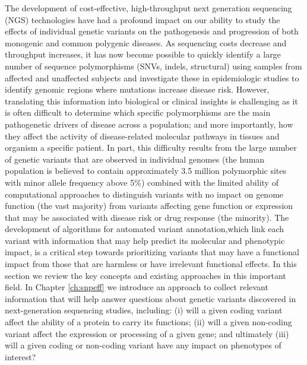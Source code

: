 The development of cost-effective, high-throughput next generation sequencing (NGS) technologies have had a profound impact on our ability to study the effects of individual genetic variants on the pathogenesis and progression of both monogenic and common polygenic diseases. As sequencing costs decrease and throughput increases, it has now become possible to quickly identify a large number of sequence polymorphisms (SNVs, indels, structural) using samples from affected and unaffected subjects and investigate these in epidemiologic studies to identify genomic regions where mutations increase disease risk. However, translating this information into biological or clinical insights is challenging as it is often difficult to determine which specific polymorphisms are the main pathogenetic drivers of disease across a population; and more importantly, how they affect the activity of disease-related molecular pathways in tissues and organism a specific patient. In part, this difficulty results from the large number of genetic variants that are observed in individual genomes (the human population is believed to contain approximately 3.5 million polymorphic sites with minor allele frequency above 5\%) combined with the limited ability of computational approaches to distinguish variants with no impact on genome function (the vast majority) from variants affecting gene function or expression that may be associated with disease risk or drug response (the minority). The development of algorithms for automated variant annotation,which link each variant with information that may help predict its molecular and phenotypic impact, is a critical step towards prioritizing variants that may have a functional impact from those that are harmless or have irrelevant functional effects. In this section we review the key concepts and existing approaches in this important field. In Chapter \ref{ch:snpeff} we introduce an approach to collect relevant information that will help answer questions about genetic variants discovered in next-generation sequencing studies, including: (i) will a given coding variant affect the ability of a protein to carry its functions; (ii) will a given non-coding variant affect the expression or processing of a given gene; and ultimately (iii) will a given coding or non-coding variant have any impact on phenotypes of interest?

